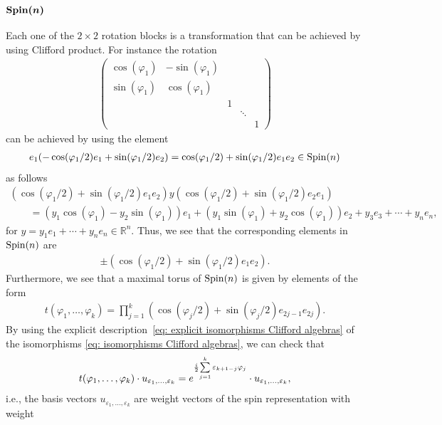 \documentclass[10pt,a4paper]{amsart}
\numberwithin{equation}{section}
\begin{document}
\subsubsection[${\rm Spin}(n)$]{$\boldsymbol{{\rm Spin}(n)}$}
Each one of the $2\times 2$ rotation blocks is a transformation that can be achieved by using Clif\/ford product. For instance the rotation
\begin{gather*}\left(
\begin{matrix}
\cos(\varphi_1) & -\sin(\varphi_1) & & & \\
\sin(\varphi_1) & \cos(\varphi_1) & & & \\
 & & 1 & & \\
 & & & \ddots & \\
 & & & & 1
\end{matrix}
\right)
\end{gather*}
can be achieved by using the element
\begin{gather*}e_1(-\cos(\varphi_1/2)e_1 + \sin(\varphi_1/2)e_2)=\cos(\varphi_1/2) + \sin(\varphi_1/2)e_1e_2 \in {\rm Spin}(n)\end{gather*}
as follows
\begin{gather*}
(\cos(\varphi_1/2) + \sin(\varphi_1/2)e_1e_2)y(\cos(\varphi_1/2) + \sin(\varphi_1/2)e_2e_1) \\
\qquad{} = (y_1\cos(\varphi_1)-y_2\sin(\varphi_1))e_1 + (y_1\sin(\varphi_1)+y_2\cos(\varphi_1))e_2+y_3e_3+\cdots+y_ne_n,
\end{gather*}
for $y=y_1e_1+\cdots+y_ne_n\in\mathbb{R}^n$. Thus, we see that the corresponding elements
in ${\rm Spin}(n)$ are
\begin{gather*}\pm(\cos(\varphi_1/2) + \sin(\varphi_1/2)e_1e_2).\end{gather*}
Furthermore, we see that a maximal torus of ${\rm Spin}(n)$ is given by elements of the form
\begin{gather*}t(\varphi_1,\dots,\varphi_{k})=\prod_{j=1}^{k} (\cos(\varphi_j/2) + \sin(\varphi_j/2)e_{2j-1}e_{2j}).\end{gather*}
By using the explicit description~\eqref{eq: explicit isomorphisms Clifford algebras} of the isomorphisms \eqref{eq: isomorphisms Clifford algebras}, we can check that
\begin{gather*}t(\varphi_1,\dots,\varphi_{k})\cdot u_{\varepsilon_1,\dots,\varepsilon_k} =e^{{i\over 2}{\sum\limits_{j=1}^{k}\varepsilon_{k+1-j}\varphi_j}}\cdot u_{\varepsilon_1,\dots,\varepsilon_k},\end{gather*}
i.e., the basis vectors $u_{\varepsilon_1,\dots,\varepsilon_k}$ are weight vectors of the spin representation with weight
\end{document}
